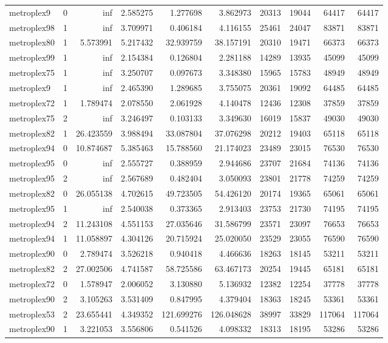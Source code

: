 \begin{longtable}{|l|r|r|r|r|r|r|r|r|r|}
metroplex9 & 0 & inf & 2.585275 & 1.277698 & 3.862973 & 20313 & 19044 & 64417 & 64417 \\
metroplex98 & 1 & inf & 3.709971 & 0.406184 & 4.116155 & 25461 & 24047 & 83871 & 83871 \\
metroplex80 & 1 & 5.573991 & 5.217432 & 32.939759 & 38.157191 & 20310 & 19471 & 66373 & 66373 \\
metroplex99 & 1 & inf & 2.154384 & 0.126804 & 2.281188 & 14289 & 13935 & 45099 & 45099 \\
metroplex75 & 1 & inf & 3.250707 & 0.097673 & 3.348380 & 15965 & 15783 & 48949 & 48949 \\
metroplex9 & 1 & inf & 2.465390 & 1.289685 & 3.755075 & 20361 & 19092 & 64485 & 64485 \\
metroplex72 & 1 & 1.789474 & 2.078550 & 2.061928 & 4.140478 & 12436 & 12308 & 37859 & 37859 \\
metroplex75 & 2 & inf & 3.246497 & 0.103133 & 3.349630 & 16019 & 15837 & 49030 & 49030 \\
metroplex82 & 1 & 26.423559 & 3.988494 & 33.087804 & 37.076298 & 20212 & 19403 & 65118 & 65118 \\
metroplex94 & 0 & 10.874687 & 5.385463 & 15.788560 & 21.174023 & 23489 & 23015 & 76530 & 76530 \\
metroplex95 & 0 & inf & 2.555727 & 0.388959 & 2.944686 & 23707 & 21684 & 74136 & 74136 \\
metroplex95 & 2 & inf & 2.567689 & 0.482404 & 3.050093 & 23801 & 21778 & 74259 & 74259 \\
metroplex82 & 0 & 26.055138 & 4.702615 & 49.723505 & 54.426120 & 20174 & 19365 & 65061 & 65061 \\
metroplex95 & 1 & inf & 2.540038 & 0.373365 & 2.913403 & 23753 & 21730 & 74195 & 74195 \\
metroplex94 & 2 & 11.243108 & 4.551153 & 27.035646 & 31.586799 & 23571 & 23097 & 76653 & 76653 \\
metroplex94 & 1 & 11.058897 & 4.304126 & 20.715924 & 25.020050 & 23529 & 23055 & 76590 & 76590 \\
metroplex90 & 0 & 2.789474 & 3.526218 & 0.940418 & 4.466636 & 18263 & 18145 & 53211 & 53211 \\
metroplex82 & 2 & 27.002506 & 4.741587 & 58.725586 & 63.467173 & 20254 & 19445 & 65181 & 65181 \\
metroplex72 & 0 & 1.578947 & 2.006052 & 3.130880 & 5.136932 & 12382 & 12254 & 37778 & 37778 \\
metroplex90 & 2 & 3.105263 & 3.531409 & 0.847995 & 4.379404 & 18363 & 18245 & 53361 & 53361 \\
metroplex53 & 2 & 23.655441 & 4.349352 & 121.699276 & 126.048628 & 38997 & 33829 & 117064 & 117064 \\
metroplex90 & 1 & 3.221053 & 3.556806 & 0.541526 & 4.098332 & 18313 & 18195 & 53286 & 53286 \\
\end{longtable}
